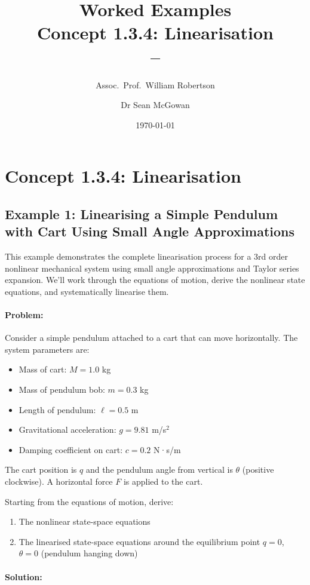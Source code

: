 \documentclass[11pt,a4paper]{article}
\title{\textbf{Worked Examples}\\[0.5em]
\large Concept 1.3.4: Linearisation\\[0.3em]
\normalsize \coursesubtitle{} -- \coursetitle}
\author{Assoc.\ Prof.\ William Robertson \and Dr Sean McGowan}
\date{\today}
\begin{document}
\maketitle
\tableofcontents
\newpage

\section{Concept 1.3.4: Linearisation}

\subsection{Example 1: Linearising a Simple Pendulum with Cart Using Small Angle Approximations}

This example demonstrates the complete linearisation process for a 3rd order nonlinear mechanical system using small angle approximations and Taylor series expansion. We'll work through the equations of motion, derive the nonlinear state equations, and systematically linearise them.

\paragraph{Problem:}
Consider a simple pendulum attached to a cart that can move horizontally. The system parameters are:
\begin{itemize}
  \item Mass of cart: $M = 1.0$ kg
  \item Mass of pendulum bob: $m = 0.3$ kg
  \item Length of pendulum: $\ell = 0.5$ m
  \item Gravitational acceleration: $g = 9.81$ m/s$^2$
  \item Damping coefficient on cart: $c = 0.2$ N·s/m
\end{itemize}

The cart position is $q$ and the pendulum angle from vertical is $\theta$ (positive clockwise). A horizontal force $F$ is applied to the cart.

Starting from the equations of motion, derive:
\begin{enumerate}
  \item The nonlinear state-space equations
  \item The linearised state-space equations around the equilibrium point $q = 0$, $\theta = 0$ (pendulum hanging down)
\end{enumerate}

\paragraph{Solution:}
\end{document}
